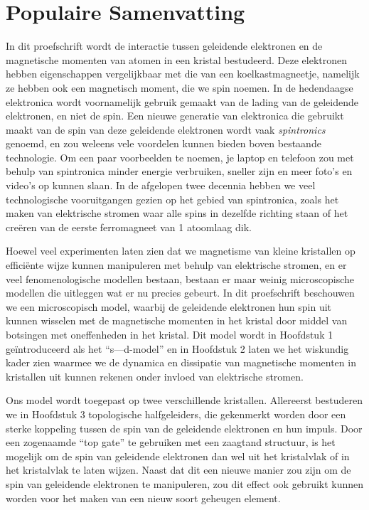 \manualmark
{}%
%
%
\chapter*{Populaire Samenvatting}%
In dit proefschrift wordt de interactie tussen geleidende elektronen en de magnetische momenten van atomen in een kristal bestudeerd. Deze elektronen hebben eigenschappen vergelijkbaar met die van een koelkastmagneetje, namelijk ze hebben ook een magnetisch moment, die we spin noemen. In de hedendaagse elektronica wordt voornamelijk gebruik gemaakt van de lading van de geleidende elektronen, en niet de spin. Een nieuwe generatie van elektronica die gebruikt maakt van de spin van deze geleidende elektronen wordt vaak \emph{spintronics} genoemd, en zou weleens vele voordelen kunnen bieden boven bestaande technologie. Om een paar voorbeelden te noemen, je laptop en telefoon zou met behulp van spintronica minder energie verbruiken, sneller zijn en meer foto's en video's op kunnen slaan. In de afgelopen twee decennia hebben we veel technologische vooruitgangen gezien op het gebied van spintronica, zoals het maken van elektrische stromen waar alle spins in dezelfde richting staan of het creëren van de eerste ferromagneet van 1 atoomlaag dik. 

Hoewel veel experimenten laten zien dat we magnetisme van kleine kristallen op efficiënte wijze kunnen manipuleren met behulp van elektrische stromen, en er veel fenomenologische modellen bestaan, bestaan er maar weinig microscopische modellen die uitleggen wat er nu precies gebeurt. In dit proefschrift beschouwen we een microscopisch model, waarbij de geleidende elektronen hun spin uit kunnen wisselen met de magnetische momenten in het kristal door middel van botsingen met oneffenheden in het kristal. Dit model wordt in Hoofdstuk 1 geïntroduceerd als het “s—d-model” en in Hoofdstuk 2 laten we het wiskundig kader zien waarmee we de dynamica en dissipatie van magnetische momenten in kristallen uit kunnen rekenen onder invloed van elektrische stromen. 

Ons model wordt toegepast op twee verschillende kristallen. Allereerst bestuderen we in Hoofdstuk 3 topologische halfgeleiders, die gekenmerkt worden door een sterke koppeling tussen de spin van de geleidende elektronen en hun impuls. Door een zogenaamde “top gate” te gebruiken met een zaagtand structuur, is het mogelijk om de spin van geleidende elektronen dan wel uit het kristalvlak of in het kristalvlak te laten wijzen. Naast dat dit een nieuwe manier zou zijn om de spin van geleidende elektronen te manipuleren, zou dit effect ook gebruikt kunnen worden voor het maken van een nieuw soort geheugen element. 

